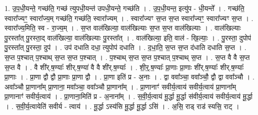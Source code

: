 \documentclass[17pt]{extarticle}
\begin{document}
1. उ॒प॒धी॒यन्ते॒ गच्छ॑ति॒ गच्छ॑ त्युपधी॒यन्त॑ उपधी॒यन्ते॒ गच्छ॑ति । . उ॒प॒धी॒यन्त॒ इत्यु॑प - धी॒यन्ते᳚ । . गच्छ॑ति॒ स्वारा᳚ज्यꣳ॒॒ स्वारा᳚ज्य॒म् गच्छ॑ति॒ गच्छ॑ति॒ स्वारा᳚ज्यम् । . स्वारा᳚ज्यꣳ स॒प्त स॒प्त स्वारा᳚ज्यꣳ॒॒ स्वारा᳚ज्यꣳ स॒प्त । . स्वारा᳚ज्य॒मिति॒ स्व - रा॒ज्य॒म् । . स॒प्त वाल॑खिल्या॒ वाल॑खिल्याः स॒प्त स॒प्त वाल॑खिल्याः । . वाल॑खिल्याः पु॒रस्ता᳚त् पु॒रस्ता॒द् वाल॑खिल्या॒ वाल॑खिल्याः पु॒रस्ता᳚त् । . वाल॑खिल्या॒ इति॒ वाल॑ - खि॒ल्याः॒ । . पु॒रस्ता॒ दुपोप॑ पु॒रस्ता᳚त् पु॒रस्ता॒ दुप॑ । . उप॑ दधाति दधा॒ त्युपोप॑ दधाति । . द॒धा॒ति॒ स॒प्त स॒प्त द॑धाति दधाति स॒प्त । . स॒प्त प॒श्चात् प॒श्चाथ् स॒प्त स॒प्त प॒श्चात् । . प॒श्चाथ् स॒प्त स॒प्त प॒श्चात् प॒श्चाथ् स॒प्त । . स॒प्त वै वै स॒प्त स॒प्त वै । . वै शी॑र्.ष॒ण्याः᳚ शीर्.ष॒ण्या॑ वै वै शी॑र्.ष॒ण्याः᳚ । . शी॒र्॒.ष॒ण्याः᳚ प्रा॒णाः प्रा॒णाः शी॑र्.ष॒ण्याः᳚ शीर्.ष॒ण्याः᳚ प्रा॒णाः । . प्रा॒णा द्वौ द्वौ प्रा॒णाः प्रा॒णा द्वौ । . प्रा॒णा इति॑ प्र - अ॒नाः । . द्वा ववा᳚ञ्चा॒ ववा᳚ञ्चौ॒ द्वौ द्वा ववा᳚ञ्चौ । . अवा᳚ञ्चौ प्रा॒णाना᳚म् प्रा॒णाना॒ मवा᳚ञ्चा॒ ववा᳚ञ्चौ प्रा॒णाना᳚म् । . प्रा॒णानाꣳ॑ सवीर्य॒त्वाय॑ सवीर्य॒त्वाय॑ प्रा॒णाना᳚म् प्रा॒णानाꣳ॑ सवीर्य॒त्वाय॑ । . प्रा॒णाना॒मिति॑ प्र - अ॒नाना᳚म् । . स॒वी॒र्य॒त्वाय॑ मू॒र्द्धा मू॒र्द्धा स॑वीर्य॒त्वाय॑ सवीर्य॒त्वाय॑ मू॒र्द्धा । . स॒वी॒र्य॒त्वायेति॑ सवीर्य - त्वाय॑ । . मू॒र्द्धा ऽस्य॑सि मू॒र्द्धा मू॒र्द्धा ऽसि॑ । . अ॒सि॒ राड् राड॑ स्यसि॒ राट् । \newline
\end{document}

